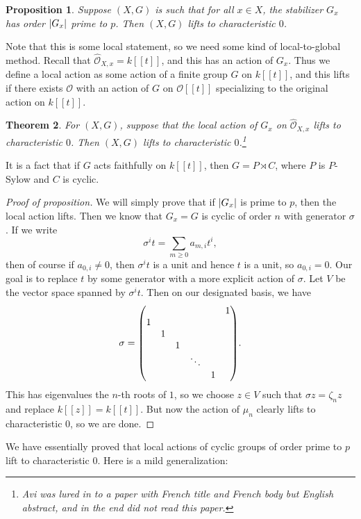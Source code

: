 \documentclass[leqno, openany]{memoir}
\newtheorem{thm}{Theorem}[section]
\newtheorem{prop}[thm]{Proposition}
\theoremstyle{definition}
\theoremstyle{remark}
\theoremstyle{plain}
\theoremstyle{definition}
\theoremstyle{remark}
\newcommand{\mc}[1]{\mathcal{#1}}
\newcommand{\wh}[1]{\widehat{#1}}
\begin{document}
\begin{prop}
    Suppose $(X,G)$ is such that for all $x \in X$, the stabilizer $G_x$ has order $\abs{G_x}$ prime to $p$. Then $(X, G)$ lifts to characteristic $0$.
\end{prop}

Note that this is some local statement, so we need some kind of local-to-global method. Recall that $\wh{\mc{O}}_{X,x} = k[[t]]$, and this has an action of $G_x$. Thus we define a local action as some action of a finite group $G$ on $k[[t]]$, and this lifts if there exists $\mc{O}$ with an action of $G$ on $\mc{O}[[t]]$ specializing to the original action on $k[[t]]$.

\begin{thm}
    For $(X, G)$, suppose that the local action of $G_x$ on $\wh{\mc{O}}_{X,x}$ lifts to characteristic $0$. Then $(X, G)$ lifts to characteristic $0$.\footnote{Avi was lured in to a paper with French title and French body but English abstract, and in the end did not read this paper.}
\end{thm}

It is a fact that if $G$ acts faithfully on $k[[t]]$, then $G = P \rtimes C$, where $P$ is $P$-Sylow and $C$ is cyclic.

\begin{proof}[Proof of proposition]
    We will simply prove that if $\abs{G_x}$ is prime to $p$, then the local action lifts. Then we know that $G_x = G$ is cyclic of order $n$ with generator $\sigma$. If we write
    \[ \sigma^i t = \sum_{m \geq 0} a_{m,i} t^i, \]
    then of course if $a_{0,i} \neq 0$, then $\sigma^i t$ is a unit and hence $t$ is a unit, so $a_{0,i} = 0$. Our goal is to replace $t$ by some generator with a more explicit action of $\sigma$. Let $V$ be the vector space spanned by $\sigma^i t$. Then on our designated basis, we have
    \[ \sigma = \mqty( & & & & & 1 \\ 1 & & & & & \\ & 1 & & & & \\ & & 1 & & & \\ & & & \ddots & & \\ & & & & 1 &). \]
    This has eigenvalues the $n$-th roots of $1$, so we choose $z \in V$ such that $\sigma z = \zeta_n z$ and replace $k[[z]] = k[[t]]$. But now the action of $\mu_n$ clearly lifts to characteristic $0$, so we are done.
\end{proof}

We have essentially proved that local actions of cyclic groups of order prime to $p$ lift to characteristic $0$. Here is a mild generalization:
\end{document}
